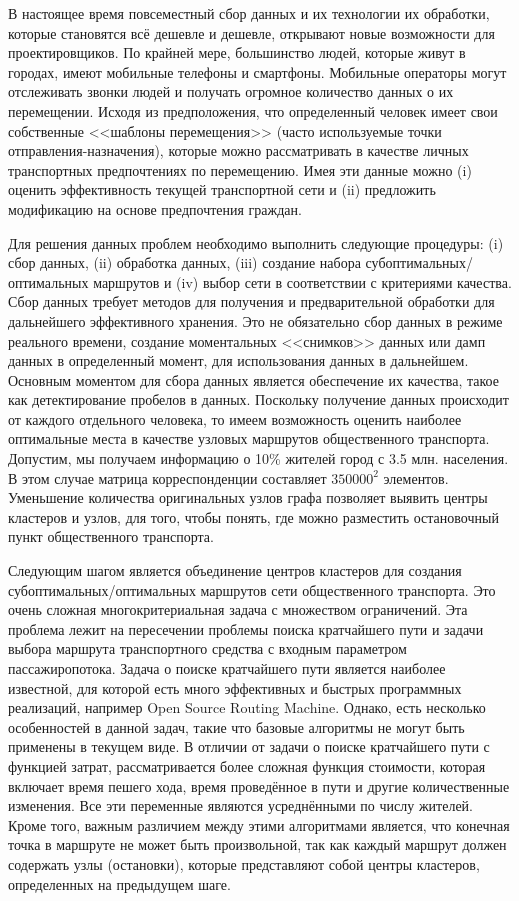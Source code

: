 В настоящее время повсеместный сбор данных и их технологии их обработки, которые становятся всё дешевле и 
дешевле, открывают новые возможности для проектировщиков. По крайней мере, большинство людей, которые 
живут в городах, имеют мобильные телефоны и смартфоны. Мобильные операторы могут отслеживать звонки людей 
и получать огромное количество данных о их перемещении. Исходя из предположения, что определенный человек 
имеет свои собственные <<шаблоны перемещения>> (часто используемые точки отправления-назначения), которые 
можно рассматривать в качестве личных транспортных предпочтениях по перемещению. Имея эти данные можно (i) 
оценить эффективность текущей транспортной сети и (ii) предложить модификацию на основе предпочтения 
граждан.

Для решения данных проблем необходимо выполнить следующие процедуры: (i) сбор данных, (ii) обработка данных, 
(iii) создание набора субоптимальных/оптимальных маршрутов и (iv) выбор сети в соответствии с критериями качества.
Сбор данных требует методов для получения и предварительной обработки для дальнейшего эффективного хранения.
Это не обязательно сбор данных в режиме реального времени, создание моментальных <<снимков>> данных или 
дамп данных в определенный момент, для использования данных в дальнейшем. Основным моментом для сбора 
данных является обеспечение их качества, такое как детектирование пробелов в данных. Поскольку получение 
данных происходит от каждого отдельного человека, то имеем возможность оценить наиболее оптимальные места в 
качестве узловых маршрутов общественного транспорта. Допустим, мы получаем информацию о 10\% жителей город 
с 3.5 млн. населения. В этом случае матрица корреспонденции составляет \( 350 000^2 \) элементов. Уменьшение 
количества оригинальных узлов графа позволяет выявить центры кластеров и узлов, для того, чтобы понять, где 
можно разместить остановочный пункт общественного транспорта.

Следующим шагом является объединение центров кластеров для создания субоптимальных/оптимальных маршрутов сети 
общественного транспорта. Это очень сложная многокритериальная задача с множеством ограничений. Эта проблема 
лежит на пересечении проблемы поиска кратчайшего пути и задачи выбора маршрута транспортного средства с 
входным параметром пассажиропотока. Задача о поиске кратчайшего пути является наиболее известной, для которой 
есть много эффективных и быстрых программных реализаций, например Open Source Routing Machine\cite{osrm}. 
Однако, есть несколько особенностей в данной задач, такие что базовые алгоритмы не могут быть применены в 
текущем виде. В отличии от задачи о поиске кратчайшего пути с функцией затрат, рассматривается более сложная 
функция стоимости, которая включает время пешего хода, время проведённое в пути и другие количественные 
изменения. Все эти переменные являются усреднёнными по числу жителей. Кроме того, важным различием между этими 
алгоритмами является, что конечная точка в маршруте не может быть произвольной, так как каждый маршрут должен 
содержать узлы (остановки), которые представляют собой центры кластеров, определенных на предыдущем шаге.

